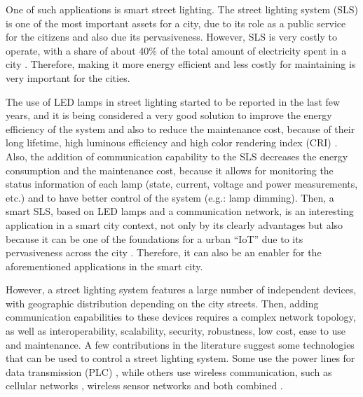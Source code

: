 \documentclass[final,authoryear,3p,twocolumn]{elsarticle}
\begin{document}
One of such applications is smart street lighting. The street lighting system (SLS) is one of the most important assets for a city, due to its role as a public service for the citizens and also due its pervasiveness. However, SLS is very costly to operate, with a share of about 40\% of the total amount of electricity spent in a city \citep{Smart_City_Smart_Light_2013}. Therefore, making it more energy efficient and less costly for maintaining is very important for the cities.

The use of LED lamps in street lighting started to be reported in the last few years, and it is being considered a very good solution to improve the energy efficiency of the system and also to reduce the maintenance cost, because of their long lifetime, high luminous efficiency and high color rendering index (CRI) \citep{CRI_2008,CRI_2010}. Also, the addition of communication capability to the SLS decreases the energy consumption and the maintenance cost, because it allows for monitoring the status information of each lamp (state, current, voltage and power measurements, etc.) and to have better control of the system (e.g.: lamp dimming). Then, a smart SLS, based on LED lamps and a communication network, is an interesting application in a smart city context, not only by its clearly advantages but also because it can be one of the foundations for a urban ``IoT'' due to its pervasiveness across the city \citep{Smart_City_Smart_Light_2013}. Therefore, it can also be an enabler for the aforementioned applications in the smart city.

However, a street lighting system features a large number of independent devices, with geographic distribution depending on the city streets. Then, adding communication capabilities to these devices requires a complex network topology, as well as interoperability, scalability, security, robustness, low cost, ease to use and maintenance. A few contributions in the literature suggest some technologies that can be used to control a street lighting system. Some use the power lines for data transmission (PLC) \citep{PLC_Street_Lighting_2003,PLC_Street_Lighting_2006}, while others use wireless communication, such as cellular networks \citep{Cellular_Street_Lighting_2009_1,Cellular_Street_Lighting_2010_1}, wireless sensor networks \citep{WSN_Street_Lighting_2010_1, WSN_Street_Lighting_2010_2} and both combined \citep{WSN_Street_lighting_2006, WSN_Street_lighting_2007}.
\end{document}
